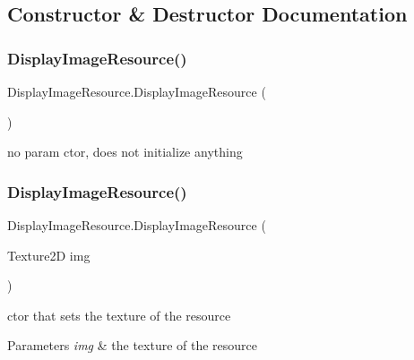 \subsection{Constructor \& Destructor Documentation}
\mbox{\label{class_display_image_resource_a8c3e434da20e617201d74cfdb913817b}} 
\subsubsection{\texorpdfstring{Display\+Image\+Resource()}{DisplayImageResource()}\hspace{0.1cm}{\footnotesize\ttfamily [1/2]}}
{\footnotesize\ttfamily Display\+Image\+Resource.\+Display\+Image\+Resource (\begin{DoxyParamCaption}{ }\end{DoxyParamCaption})}



no param ctor, does not initialize anything 

\mbox{\label{class_display_image_resource_aa7b4bf3e8d324ea5b789322748b21b8e}} 
\subsubsection{\texorpdfstring{Display\+Image\+Resource()}{DisplayImageResource()}\hspace{0.1cm}{\footnotesize\ttfamily [2/2]}}
{\footnotesize\ttfamily Display\+Image\+Resource.\+Display\+Image\+Resource (\begin{DoxyParamCaption}\item[{Texture2D}]{img }\end{DoxyParamCaption})}



ctor that sets the texture of the resource 


\begin{DoxyParams}{Parameters}
{\em img} & the texture of the resource\\
\hline
\end{DoxyParams}


